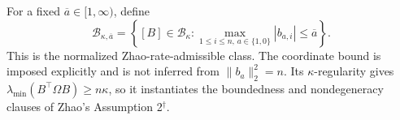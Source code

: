 For a fixed \(\overline a\in[1,\infty)\), define
\[
\mathcal B_{\kappa,\overline a}
=\left\{[B]\in\mathcal B_\kappa:
\max_{1\le i\le n,\,a\in\{1,0\}}|b_{a,i}|\le\overline a\right\}.
\]
This is the normalized Zhao-rate-admissible class.  The coordinate bound is imposed explicitly and is not inferred from \(\lVert b_a\rVert_2^2=n\).  Its \(\kappa\)-regularity gives \(\lambda_{\min}(B^{\top}\Omega B)\ge n\kappa\), so it instantiates the boundedness and nondegeneracy clauses of Zhao's Assumption 2\(^{\dagger}\).